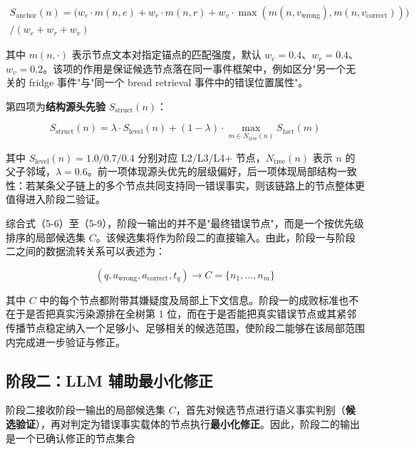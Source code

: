 \begin{equation}
\begin{aligned}
S_{\mathrm{anchor}}(n) = \big( w_e \cdot m(n,e) + w_r \cdot m(n,r) + w_v \cdot \max(m(n,v_{\mathrm{wrong}}), m(n,v_{\mathrm{correct}})) \big) \\
/ (w_e + w_r + w_v)
\end{aligned}
\label{eq:5-8}
\end{equation}

其中 $m(n,\cdot)$ 表示节点文本对指定锚点的匹配强度，默认 $w_e=0.4$、$w_r=0.4$、$w_v=0.2$。该项的作用是保证候选节点落在同一事件框架中，例如区分"另一个无关的 fridge 事件"与"同一个 bread retrieval 事件中的错误位置属性"。

第四项为\textbf{结构源头先验} $S_{\mathrm{struct}}(n)$：

\begin{equation}
S_{\mathrm{struct}}(n) = \lambda \cdot S_{\mathrm{level}}(n) + (1 - \lambda) \cdot \max_{m \in N_{\mathrm{tree}}(n)} S_{\mathrm{fact}}(m)
\label{eq:5-9}
\end{equation}

其中 $S_{\mathrm{level}}(n)=1.0/0.7/0.4$ 分别对应 L2/L3/L4+ 节点，$N_{\mathrm{tree}}(n)$ 表示 $n$ 的父子邻域，$\lambda=0.6$。前一项体现源头优先的层级偏好，后一项体现局部结构一致性：若某条父子链上的多个节点共同支持同一错误事实，则该链路上的节点整体更值得进入阶段二验证。

综合式（5-6）至（5-9），阶段一输出的并不是"最终错误节点"，而是一个按优先级排序的局部候选集 $C$。该候选集将作为阶段二的直接输入。由此，阶段一与阶段二之间的数据流转关系可以表述为：

\begin{equation}
(q, a_{\mathrm{wrong}}, a_{\mathrm{correct}}, t_q) \rightarrow C = \{n_1, \ldots, n_m\}
\end{equation}

其中 $C$ 中的每个节点都附带其嫌疑度及局部上下文信息。阶段一的成败标准也不在于是否把真实污染源排在全树第 1 位，而在于是否能把真实错误节点或其紧邻传播节点稳定纳入一个足够小、足够相关的候选范围，使阶段二能够在该局部范围内完成进一步验证与修正。

\subsection{阶段二：LLM 辅助最小化修正}

阶段二接收阶段一输出的局部候选集 $C$，首先对候选节点进行语义事实判别（\textbf{候选验证}），再对判定为错误事实载体的节点执行\textbf{最小化修正}。因此，阶段二的输出是一个已确认修正的节点集合

